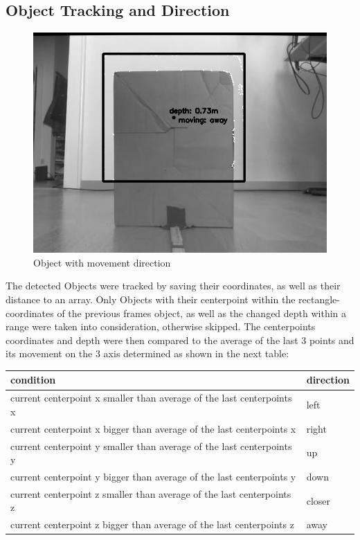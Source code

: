 \documentclass[journal,onecolumn]{IEEEtran}
\begin{document}
\subsection{Object Tracking and Direction}
\begin{figure}[H]
	\centering
	\includegraphics[scale=0.5]{box_direction.png}
	\captionsetup{justification=centering}
	\caption{Object with movement direction}
\end{figure}
\noindent The detected Objects were tracked by saving their coordinates, as well as their distance to an array. Only Objects with their centerpoint within the rectangle-coordinates of the previous frames object, as well as the changed depth within a range were taken into consideration, otherwise skipped. The centerpoints coordinates and depth were then compared to the average of the last 3 points and its movement on the 3 axis determined as shown in the next table: 
\begin{table}[H]
	\begin{tabular}{|l|l|}
		\hline
		condition & direction \\ \hline
		 current centerpoint x smaller than average of the last centerpoints x             & left               \\ \hline
		 current centerpoint x bigger than average of the last centerpoints x              & right               \\ \hline
		 current centerpoint y smaller than average of the last centerpoints y             & up               \\ \hline
		 current centerpoint y bigger than average of the last centerpoints y             & down             \\ \hline
		 current centerpoint z smaller than average of the last centerpoints z             & closer             \\ \hline
		 current centerpoint z bigger than average of the last centerpoints z              & away              \\ \hline
	\end{tabular}
\end{table}
\end{document}
